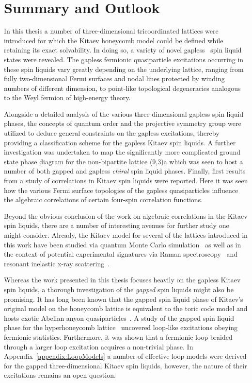 \chapter{Summary and Outlook}
\label{chapter:Conclusion}
%
%
In this thesis a number of three-dimensional tricoordinated lattices were introduced for which the Kitaev honeycomb model could be defined while retaining its exact solvability.
In doing so, a variety of novel gapless \ZZ~spin liquid states were revealed.
The gapless fermionic quasiparticle excitations occurring in these spin liquids vary greatly depending on the underlying lattice, ranging from fully two-dimensional Fermi surfaces and nodal lines protected by winding numbers of different dimension, to point-like topological degeneracies analogous to the Weyl fermion of high-energy theory.

Alongside a detailed analysis of the various three-dimensional gapless spin liquid phases, the concepts of quantum order and the projective symmetry group were utilized to deduce general constraints on the gapless excitations, thereby providing a classification scheme for the gapless Kitaev spin liquids.
A further investigation was undertaken to map the significantly more complicated ground state phase diagram for the non-bipartite lattice (9,3)a which was seen to host a number of both gapped and gapless \textit{chiral} spin liquid phases.
Finally, first results from a study of correlations in Kitaev spin liquids were reported.
Here it was seen how the various Fermi surface topologies of the gapless quasiparticles influence the algebraic correlations of certain four-spin correlation functions.

Beyond the obvious conclusion of the work on algebraic correlations in the Kitaev spin liquids, there are a number of interesting avenues for further study one might consider.
Already, the Kitaev model for several of the lattices introduced in this work have been studied via quantum Monte Carlo simulation~\cite{YasuyukiPRB2017,EschmannPRL2019} as well as in the context of potential experimental signatures via Raman spectroscopy~\cite{PerreaultPRB2016a,PerreaultPRB2016b} and resonant inelastic x-ray scattering~\cite{HalaszPRL2017}.

Whereas the work presented in this thesis focuses heavily on the gapless Kitaev spin liquids, a thorough investigation of the \textit{gapped} spin liquids might also be promising.
It has long been known that the gapped spin liquid phase of Kitaev's original model on the honeycomb lattice is equivalent to the toric code model and hosts exotic Abelian anyon quasiparticles~\cite{KitaevAoP2006}.
A study of the gapped spin liquid phase for the hyperhoneycomb lattice~\cite{MandalPRB2014} uncovered loop-like excitations obeying fermionic statistics.
Furthermore, it was shown that a fermionic loop braided through a larger loop excitation acquires a non-trivial phase.
In Appendix~\ref{appendix:LoopModels} a number of effective loop models were derived for the gapped three-dimensional Kitaev spin liquids, however, the nature of their excitations remains an open question.


